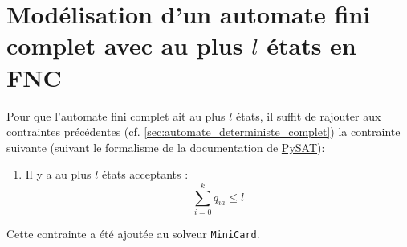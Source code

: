 \documentclass[a4paper, 12pt]{extarticle}
\begin{document}
\begin{center}
    
\end{center}
    
    \section{Modélisation d'un automate fini complet avec au plus $l$ états en FNC}
    \noindent Pour que l'automate fini complet ait au plus $l$ états, il suffit de rajouter aux contraintes précédentes (cf. \ref{sec:automate_deterministe_complet}) 
    la contrainte suivante (suivant le formalisme de la documentation de \href{https://pysathq.github.io/docs/html/api/solvers.html#pysat.solvers.Solver.add_atmost}{PySAT}):
    \begin{enumerate}
        \item Il y a au plus $l$ états acceptants :
        \begin{equation*}
            \sum_{i=0}^{k} q_{ia} \le l
        \end{equation*}
    \end{enumerate}
    Cette contrainte a été ajoutée au solveur \texttt{MiniCard}.
    
    
\end{document}
